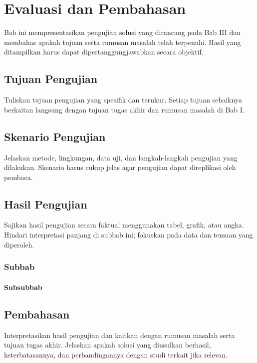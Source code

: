 %
%
%
%
%

\chapter{Evaluasi dan Pembahasan}

Bab ini mempresentasikan pengujian solusi yang dirancang pada Bab
III dan membahas apakah tujuan serta rumusan masalah telah
terpenuhi. Hasil yang ditampilkan harus dapat dipertanggungjawabkan
secara objektif.

\section{Tujuan Pengujian}

Tuliskan tujuan pengujian yang spesifik dan terukur. Setiap tujuan
sebaiknya berkaitan langsung dengan tujuan tugas akhir dan
rumusan masalah di Bab I.

\blindtext

\section{Skenario Pengujian}

Jelaskan metode, lingkungan, data uji, dan langkah-langkah
pengujian yang dilakukan. Skenario harus cukup jelas agar pengujian
dapat direplikasi oleh pembaca.

\blindtext

\section{Hasil Pengujian}

Sajikan hasil pengujian secara faktual menggunakan tabel, grafik,
atau angka. Hindari interpretasi panjang di subbab ini; fokuskan
pada data dan temuan yang diperoleh.

    \subsection{Subbab}

    \blindtext

    \subsubsection{Subsubbab}

    \blindtext

\blindtext

\section{Pembahasan}

Interpretasikan hasil pengujian dan kaitkan dengan rumusan masalah
serta tujuan tugas akhir. Jelaskan apakah solusi yang diusulkan
berhasil, keterbatasannya, dan perbandingannya dengan studi terkait
jika relevan.

\blindtext
